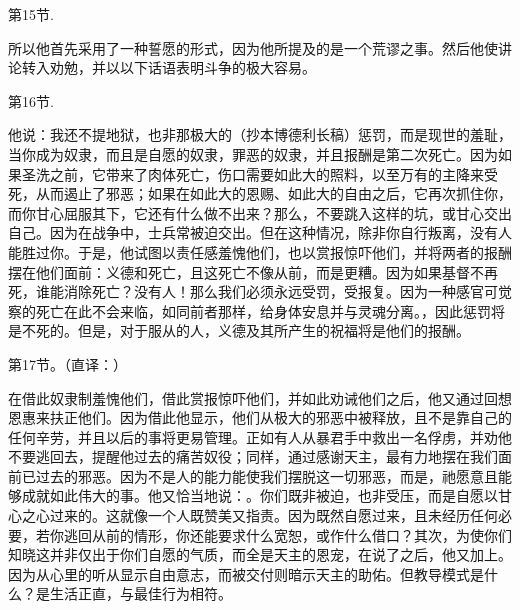 第15节. \par

所以他首先采用了一种誓愿的形式，因为他所提及的是一个荒谬之事。然后他使讲论转入劝勉，并以以下话语表明斗争的极大容易。\par

第16节. \par

他说：我还不提地狱，也非那极大的（抄本博德利长稿）惩罚，而是现世的羞耻，当你成为奴隶，而且是自愿的奴隶，罪恶的奴隶，并且报酬是第二次死亡。因为如果圣洗之前，它带来了肉体死亡，伤口需要如此大的照料，以至万有的主降来受死，从而遏止了邪恶；如果在如此大的恩赐、如此大的自由之后，它再次抓住你，而你甘心屈服其下，它还有什么做不出来？那么，不要跳入这样的坑，或甘心交出自己。因为在战争中，士兵常被迫交出。但在这种情况，除非你自行叛离，没有人能胜过你。于是，他试图以责任感羞愧他们，也以赏报惊吓他们，并将两者的报酬摆在他们面前：义德和死亡，且这死亡不像从前，而是更糟。因为如果基督不再死，谁能消除死亡？没有人！那么我们必须永远受罚，受报复。因为一种感官可觉察的死亡在此不会来临，如同前者那样，给身体安息并与灵魂分离。，因此惩罚将是不死的。但是，对于服从的人，义德及其所产生的祝福将是他们的报酬。\par

第17节。（直译：）\par

在借此奴隶制羞愧他们，借此赏报惊吓他们，并如此劝诫他们之后，他又通过回想恩惠来扶正他们。因为借此他显示，他们从极大的邪恶中被释放，且不是靠自己的任何辛劳，并且以后的事将更易管理。正如有人从暴君手中救出一名俘虏，并劝他不要逃回去，提醒他过去的痛苦奴役；同样，通过感谢天主，最有力地摆在我们面前已过去的邪恶。因为不是人的能力能使我们摆脱这一切邪恶，而是，祂愿意且能够成就如此伟大的事。他又恰当地说：。你们既非被迫，也非受压，而是自愿以甘心之心过来的。这就像一个人既赞美又指责。因为既然自愿过来，且未经历任何必要，若你逃回从前的情形，你还能要求什么宽恕，或作什么借口？其次，为使你们知晓这并非仅出于你们自愿的气质，而全是天主的恩宠，在说了之后，他又加上。因为从心里的听从显示自由意志，而被交付则暗示天主的助佑。但教导模式是什么？是生活正直，与最佳行为相符。\par

